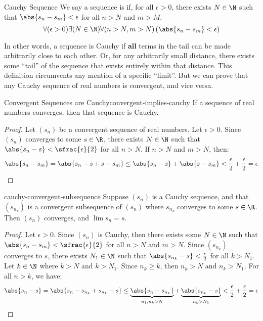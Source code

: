 \begin{dfnbox}{Cauchy Sequence}{}
    We say a sequence is  if, for all $\epsilon > 0$, there exists $N \in \N$ such that $\abs{s_n - s_m} < \epsilon$ for all $n > N$ and $m > M$.
    \tcblower
    \[ \forall(\epsilon > 0) \exists(N \in \N) \forall(n > N, m > N) \left( \abs{s_n - s_m} < \epsilon \right) \]
\end{dfnbox}

In other words, a sequence is Cauchy if \textbf{all} terms in the tail can be made arbitrarily close to each other. Or, for any arbitrarily small distance, there exists some ``tail'' of the sequence that exists entirely within that distance. This definition circumvents any mention of a specific ``limit''. But we can prove that any Cauchy sequence of real numbers is convergent, and vice versa.

\begin{lembox}{Convergent Sequences are Cauchy}{convergent-implies-cauchy}
    If a sequence of real numbers converges, then that sequence is Cauchy.
    \tcblower
    \begin{proof}
        Let $(s_n)$ be a convergent sequence of real numbers. Let $\epsilon > 0$. Since $(s_n)$ converges to some $s \in \R$, there exists $N \in \N$ such that $\abs{s_n - s} < \sfrac{\epsilon}{2}$ for all $n > N$. If $n > N$ and $m > N$, then:
        \[ \abs{s_n - s_m} = \abs{s_n - s + s - s_m} \leq \abs{s_n - s} + \abs{s - s_m} < \frac{\epsilon}{2} + \frac{\epsilon}{2} = \epsilon \]
    \end{proof}
\end{lembox}

\begin{lembox}{}{cauchy-convergent-subsequence}
    Suppose $(s_n)$ is a Cauchy sequence, and that $(s_{n_k})$ is a convergent subsequence of $(s_n)$ where $s_{n_k}$ converges to some $s \in \R$. Then $(s_n)$ converges, and $\lim s_n = s$.
    \tcblower
    \begin{proof}
        Let $\epsilon > 0$. Since $(s_n)$ is Cauchy, then there exists some $N \in \N$ such that $\abs{s_n - s_m} < \sfrac{\epsilon}{2}$ for all $n > N$ and $m > N$. Since $(s_{n_k})$ converges to $s$, there exists $N_1 \in \N$ such that $\abs{s_{n_k} - s} < \frac{\epsilon}{2}$ for all $k > N_1$. Let $k \in \N$ where $k > N$ and $k > N_1$. Since $n_k \geq k$, then $n_k > N$ and $n_k > N_1$. For all $n > k$, we have:
        \[ \abs{s_n - s} = \abs{s_n - s_{n_k} + s_{n_k} - s} \leq \underbrace{\abs{s_n - s_{n_k}}}_{n_1, n_k > N} + \underbrace{\abs{s_{n_k} - s}}_{n_k > N_1} < \frac{\epsilon}{2} + \frac{\epsilon}{2} = \epsilon\]
    \end{proof}
\end{lembox}

